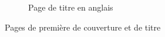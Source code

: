 \begin{landscape}
\begin{figure}[htb]
\begin{subfigure}[b]{.45\linewidth}
      \caption{Page de titre en anglais}
      \label{fig-maketitle-en}
    \end{subfigure}%
    \caption{Pages de première de couverture et de titre}
    \label{fig-maketitle}
  \end{figure}
\end{landscape}

